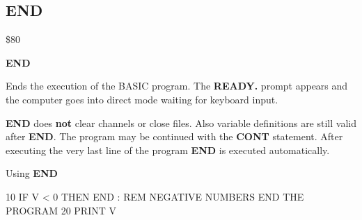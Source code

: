 \subsection{END}
\begin{description}[leftmargin=3cm,style=nextline]
\item [Token:] \$80
\item [Format:] {\bf END}
\item [Usage:] Ends the execution
               of the BASIC program. The {\bf READY.} prompt
               appears and the computer goes into direct mode
               waiting for keyboard input.

\item [Remarks:]
               {\bf END} does {\bf not} clear channels or close files.
               Also variable definitions are still valid after {\bf END}.
               The program may be continued with the {\bf CONT}
               statement. After executing the very last line of the
               program {\bf END} is executed automatically.


\item [Example:]
                Using {\bf END}
\begin{screenoutput}
10 IF V < 0 THEN END : REM NEGATIVE NUMBERS END THE PROGRAM
20 PRINT V
\end{screenoutput}
\end{description}


\newpage
